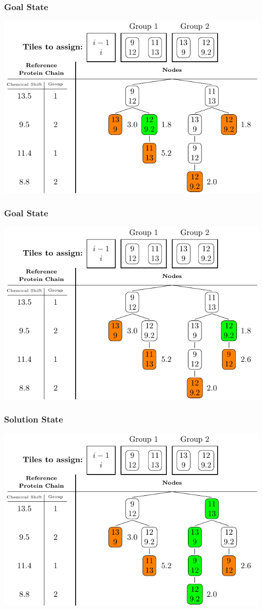 \documentclass{beamer}
\begin{document}
\begin{frame}
	\frametitle{Goal State}
	\vspace{-.5cm} 
	\center
	\includegraphics[width=.9\textwidth]{tilePlacement/step8}
\end{frame}

\begin{frame}
	\frametitle{Goal State}
	\vspace{-.5cm} 
	\center
	\includegraphics[width=.9\textwidth]{tilePlacement/step9}
\end{frame}

\begin{frame}
	\frametitle{Solution State}
	\vspace{-.5cm} 
	\center
	\includegraphics[width=.9\textwidth]{tilePlacement/step10}
\end{frame}
\end{document}
